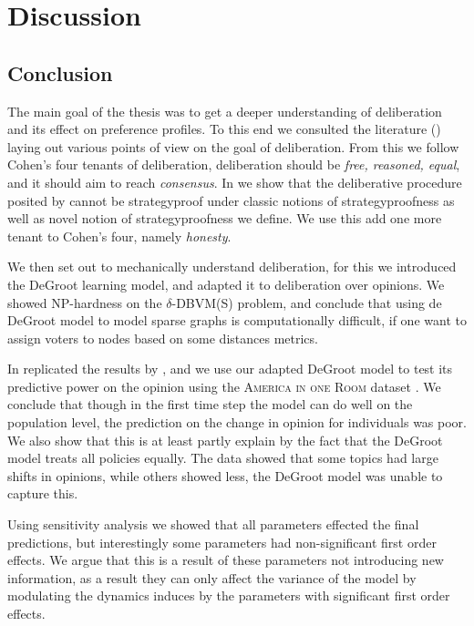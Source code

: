 \newpage
\chapter{Discussion}
\label{Discussion}

\section{Conclusion}

The main goal of the thesis was to get a deeper understanding of deliberation
and its effect on preference profiles. To this end we consulted the literature
() laying out various points of view on the goal of
deliberation. From this we follow Cohen's
\cite{cohenDeliberationDemocraticLegimitimacy2002} four tenants of
deliberation, deliberation should be \textit{free, reasoned, equal}, and  it
should aim to reach \textit{consensus}. In  we show that the
deliberative procedure posited by
\citet{radDeliberationSinglePeakednessCoherent2021} cannot be strategyproof
under classic notions of strategyproofness as well as novel notion of
strategyproofness we define. We use this add one more tenant to Cohen's four,
namely \textit{honesty}.

We then set out to mechanically understand deliberation, for this we introduced
the DeGroot learning model, and adapted it to deliberation over opinions. We showed
NP-hardness on the $\delta$-DBVM(S) problem, and conclude that using de DeGroot model
to model sparse graphs is computationally difficult, if one want to assign voters to nodes
based on some distances metrics.

In  replicated the results by
\citet{radDeliberationSinglePeakednessCoherent2021}, and we use our adapted
DeGroot model to test its predictive power on the opinion using the
\textsc{America in one Room} dataset \cite{fishkinCanDeliberationHave2024}. We
conclude that though in the first time step the model can do well on the
population level, the prediction on the change in opinion for individuals was
poor. We also show that this is at least partly explain by the fact that the
DeGroot model treats all policies equally. The data showed that some topics had
large shifts in opinions, while others showed less, the DeGroot model was
unable to capture this.

Using sensitivity analysis we showed that all parameters effected the final
predictions, but interestingly some parameters had non-significant first order
effects. We argue that this is a result of these parameters not introducing new
information, as a result they can only affect the variance of the model by
modulating the dynamics induces by the parameters with significant first order
effects.

